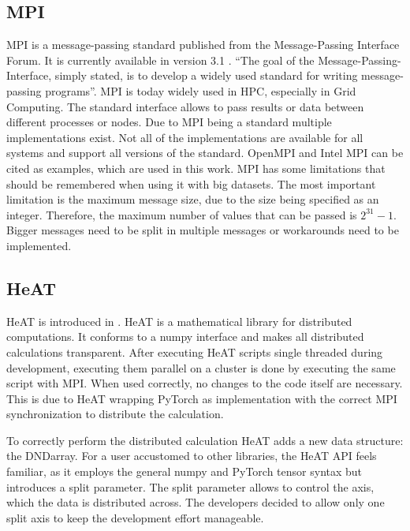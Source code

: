 \subsection{MPI}
\label{subec:mpi}
\gls{MPI} is a message-passing standard published from the Message-Passing Interface Forum. It is currently available in version 3.1 \cite{message_passing_interface_forum_mpi_2015}.
\enquote{The goal of the Message-Passing-Interface, simply stated, is to develop a widely used standard for writing message-passing programs}\cite{message_passing_interface_forum_mpi_2015}.
\gls{MPI} is today widely used in \gls{HPC}, especially in Grid Computing. The standard interface allows to pass results or data between different processes or nodes.
Due to \gls{MPI} being a standard multiple implementations exist. Not all of the implementations are available for all systems and support all versions of the standard.
OpenMPI \cite{noauthor_open_nodate} and Intel MPI \cite{noauthor_intel_nodate} can be cited as examples, which are used in this work.
\gls{MPI} has some limitations that should be remembered when using it with big datasets. The most important limitation is the maximum message size, due to the size
being specified as an integer. Therefore, the maximum number of values that can be passed is \(2^{31} - 1\). Bigger messages need to be split in multiple messages or workarounds need to be implemented.

\subsection{HeAT}
\label{subsec:heat}
\gls{HeAT} is introduced in \cite{krajsek_helmholtz_nodate}. \gls{HeAT} is a mathematical library for distributed computations.
It conforms to a \gls{numpy} \cite{noauthor_numpy_nodate} interface and makes all distributed calculations transparent.
After executing \gls{HeAT} scripts single threaded during development, executing them parallel on a cluster is done by executing the same script with \gls{MPI}.
When used correctly, no changes to the code itself are necessary.
This is due to \gls{HeAT} wrapping \gls{PyTorch} as implementation with the correct \gls{MPI} synchronization to distribute the calculation.

To correctly perform the distributed calculation \gls{HeAT} adds a new data structure: the \gls{DNDarray}.
For a user accustomed to other libraries, the \gls{HeAT} API feels familiar, as it employs the general \gls{numpy} and \gls{PyTorch} tensor syntax
but introduces a split parameter.
The split parameter allows to control the axis, which the data is distributed across.
The developers decided to allow only one split axis to keep the development effort manageable.

